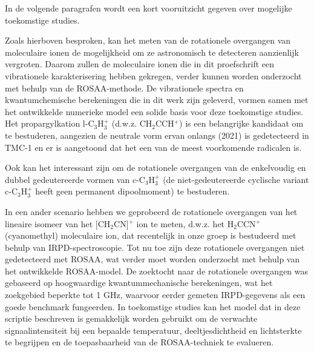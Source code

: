 {In de volgende paragrafen wordt een kort vooruitzicht gegeven over mogelijke toekomstige studies.

Zoals hierboven besproken, kan het meten van de rotationele overgangen van moleculaire ionen de mogelijkheid om ze 
astronomisch te detecteren aanzienlijk vergroten. Daarom zullen de moleculaire ionen die in dit proefschrift een 
vibrationele karakterisering hebben gekregen, verder kunnen worden onderzocht met behulp van de ROSAA-methode. De 
vibrationele spectra en kwantumchemische berekeningen die in dit werk zijn geleverd, vormen samen met het ontwikkelde 
numerieke model een solide basis voor deze toekomstige studies. Het propargylkation l-C$_3$H$_3^+$ (d.w.z. CH$_2$CCH$^+$) is een belangrijke kandidaat om te bestuderen, aangezien de neutrale vorm ervan onlangs (2021) is gedetecteerd in TMC-1 en er is aangetoond dat het een van de meest voorkomende radicalen is.

Ook kan het interessant zijn om de rotationele overgangen van de enkelvoudig en dubbel gedeutereerde vormen van c-C$_3$H$_3^+$ (de niet-gedeutereerde cyclische variant c-C$_3$H$_3^+$ heeft geen permanent dipoolmoment) te bestuderen. 

In een ander scenario hebben we geprobeerd de rotationele overgangen van het lineaire isomeer van het [CH$_2$CN]$^+$ ion te meten, d.w.z. het H$_2$CCN$^+$ (cyanomethyl) moleculaire ion, dat recentelijk in onze groep is bestudeerd met behulp van IRPD-spectroscopie. Tot nu toe zijn deze rotationele overgangen niet gedetecteerd met ROSAA, wat verder moet worden onderzocht met behulp van het ontwikkelde ROSAA-model. De zoektocht naar de rotationele overgangen was gebaseerd op hoogwaardige kwantummechanische berekeningen, wat het zoekgebied beperkte tot 1 GHz, waarvoor eerder gemeten IRPD-gegevens als een goede benchmark fungeerden. In toekomstige studies kan het model dat in deze scriptie beschreven is gemakkelijk worden gebruikt om de verwachte signaalintensiteit bij een bepaalde temperatuur, deeltjesdichtheid en lichtsterkte te begrijpen en de toepasbaarheid van de ROSAA-techniek te evalueren.

}
